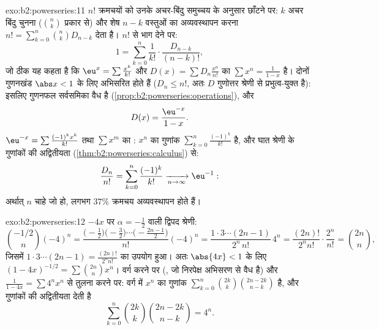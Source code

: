 \begin{solution}{exo:b2:powerseries:11}
$n!$ क्रमचयों को उनके अचर-बिंदु समुच्चय के अनुसार छाँटने पर: $k$ अचर बिंदु
चुनना ($\binom nk$ प्रकार से) और शेष $n - k$ वस्तुओं का अव्यवस्थापन करना $n! = \sum_{k=0}^n\binom nk D_{n-k}$ देता है।
$n!$ से भाग देने पर:
\[
1 = \sum_{k=0}^{n}\frac{1}{k!}\cdot\frac{D_{n-k}}{(n-k)!} ,
\]
जो ठीक यह कहता है कि $\eu^x =
\sum\frac{x^k}{k!}$ और $D(x) = \sum D_n\frac{x^n}{n!}$ का  $\sum x^n = \frac{1}{1-x}$ है। दोनों गुणनखंड $\abs x < 1$
के लिए  अभिसरित होते हैं ($D_n \leq n!$, अतः $D$ गुणोत्तर श्रेणी से
प्रभुत्व-युक्त है): इसलिए गुणनफल सर्वसमिका वैध है (\cref{prop:b2:powerseries:operations}), और
\[
D(x) = \frac{\eu^{-x}}{1-x} .
\]
$\eu^{-x} = \sum\frac{(-1)^kx^k}{k!}$ तथा $\sum x^m$ का : $x^n$ का गुणांक $\sum_{k=0}^{n}\frac{(-1)^k}{k!}$ है, और घात श्रेणी के
गुणांकों की अद्वितीयता (\cref{thm:b2:powerseries:calculus}) से:
\[
\frac{D_n}{n!} = \sum_{k=0}^{n}\frac{(-1)^k}{k!}
\xrightarrow[n\to\infty]{} \eu^{-1} :
\]
अर्थात् $n$ चाहे जो हो, लगभग $37\%$ क्रमचय अव्यवस्थापन होते हैं।
\end{solution}

\begin{solution}{exo:b2:powerseries:12}
$-4x$ पर $\alpha = -\frac12$ वाली द्विपद श्रेणी:
\[
\binom{-1/2}{n}(-4)^n
= \frac{\bigl(-\frac12\bigr)\bigl(-\frac32\bigr)\cdots
\bigl(-\frac{2n-1}2\bigr)}{n!}(-4)^n
= \frac{1\cdot3\cdots(2n-1)}{2^n\,n!}\,4^n
= \frac{(2n)!}{2^n n!}\cdot\frac{2^n}{n!}
= \binom{2n}{n},
\]
जिसमें $1\cdot3\cdots(2n-1) = \frac{(2n)!}{2^nn!}$ का उपयोग हुआ। अतः $\abs{4x} < 1$ के लिए $(1-4x)^{-1/2} = \sum\binom{2n}nx^n$। वर्ग करने पर (,
जो निरपेक्ष अभिसरण से वैध है) और $\frac{1}{1-4x} = \sum 4^nx^n$ से तुलना करने पर: वर्ग में $x^n$ का
गुणांक $\sum_{k=0}^n\binom{2k}k\binom{2n-2k}{n-k}$ है, और गुणांकों की अद्वितीयता देती है
\[
\sum_{k=0}^{n}\binom{2k}{k}\binom{2n-2k}{n-k} = 4^n .
\]
\end{solution}


